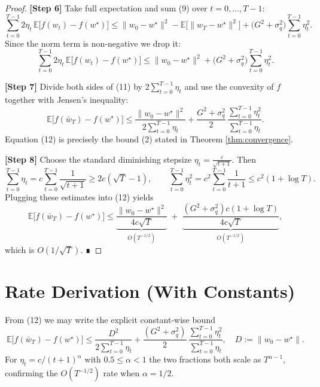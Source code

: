 \documentclass{article}
\newcommand{\E}{\mathbb{E}}
\begin{document}
\begin{proof}
\textbf{[Step 6]} Take full expectation and sum (9) over $t=0,\dots,T-1$:
\[
\sum_{t=0}^{T-1}2\eta_t\,\E\!\big[f(w_t)-f(w^{\star})\big]
\le \|w_{0}-w^{\star}\|^{2}
-\E\!\big[\|w_{T}-w^{\star}\|^{2}\big]
+\big(G^{2}+ \sigma_{q}^{2}\big)\sum_{t=0}^{T-1}\eta_t^{2}.
\tag{10}
\]
Since the norm term is non‑negative we drop it:
\[
\sum_{t=0}^{T-1}2\eta_t\,\E\!\big[f(w_t)-f(w^{\star})\big]
\le \|w_{0}-w^{\star}\|^{2}
+\big(G^{2}+ \sigma_{q}^{2}\big)\sum_{t=0}^{T-1}\eta_t^{2}.
\tag{11}
\]

\textbf{[Step 7]} Divide both sides of (11) by $2\sum_{t=0}^{T-1}\eta_t$ and use the convexity of $f$ together with Jensen’s inequality:
\[
\E\!\big[f(\bar w_T)-f(w^{\star})\big]
\le
\frac{\|w_{0}-w^{\star}\|^{2}}{2\sum_{t=0}^{T-1}\eta_t}
+\frac{G^{2}+ \sigma_{q}^{2}}{2}\,
\frac{\sum_{t=0}^{T-1}\eta_t^{2}}{\sum_{t=0}^{T-1}\eta_t}.
\tag{12}
\]
Equation (12) is precisely the bound (2) stated in Theorem \ref{thm:convergence}.

\textbf{[Step 8]} Choose the standard diminishing stepsize $\eta_t = \frac{c}{\sqrt{t+1}}$. Then
\[
\sum_{t=0}^{T-1}\eta_t = c\sum_{t=0}^{T-1}\frac{1}{\sqrt{t+1}}
\ge 2c(\sqrt{T}-1),\qquad
\sum_{t=0}^{T-1}\eta_t^{2}=c^{2}\sum_{t=0}^{T-1}\frac{1}{t+1}
\le c^{2}(1+\log T).
\]
Plugging these estimates into (12) yields
\[
\E\!\big[f(\bar w_T)-f(w^{\star})\big]
\le
\underbrace{\frac{\|w_{0}-w^{\star}\|^{2}}{4c\sqrt{T}}}_{\displaystyle O(T^{-1/2})}
\;+\;
\underbrace{\frac{(G^{2}+ \sigma_{q}^{2})c(1+\log T)}{4c\sqrt{T}}}_{\displaystyle O(T^{-1/2})},
\]
which is $O(1/\sqrt{T})$.  ∎
\end{proof}

\section*{Rate Derivation (With Constants)}
From (12) we may write the explicit constant‑wise bound
\[
\E\!\big[f(\bar w_T)-f(w^{\star})\big]
\le
\frac{D^{2}}{2\sum_{t=0}^{T-1}\eta_t}
+\frac{(G^{2}+\sigma_{q}^{2})}{2}\,
\frac{\sum_{t=0}^{T-1}\eta_t^{2}}{\sum_{t=0}^{T-1}\eta_t},
\quad D:=\|w_{0}-w^{\star}\|.
\]
For $\eta_t = c/(t+1)^{\alpha}$ with $0.5\le\alpha<1$ the two fractions both scale as $T^{\alpha-1}$, confirming the $O(T^{-1/2})$ rate when $\alpha=1/2$.

\end{document}
